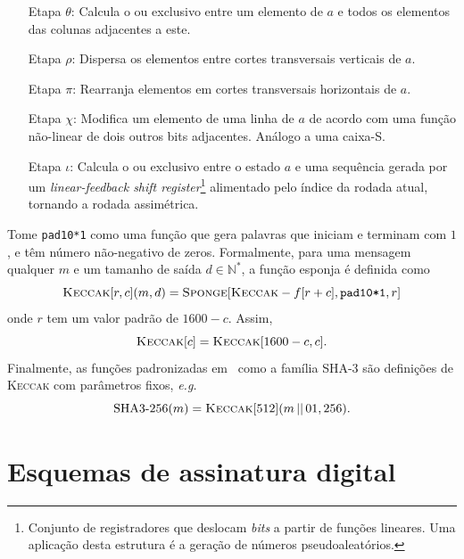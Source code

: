 \documentclass[12pt,notitlepage]{report}
\newcommand{\concat}{\, \vert \vert \,}
\begin{document}
\begin{enumerate}

  \item[Etapa $\theta$:] Calcula o ou exclusivo entre um elemento de $a$ e
      todos os elementos das colunas adjacentes a este.

  \item[Etapa $\rho$:] Dispersa os elementos entre cortes transversais
      verticais de $a$.

  \item[Etapa $\pi$:] Rearranja elementos em cortes transversais horizontais de
      $a$.

  \item[Etapa $\chi$:] Modifica um elemento de uma linha de $a$ de acordo com
      uma função não-linear de dois outros bits adjacentes. Análogo a uma
        caixa-S.

  \item[Etapa $\iota$:] Calcula o ou exclusivo entre o estado $a$ e uma
      sequência gerada por um \emph{linear-feedback shift register}\footnote{Conjunto de registradores que deslocam \emph{bits} a partir de funções lineares. Uma aplicação desta estrutura é a geração de números pseudoaleatórios.} alimentado
        pelo índice da rodada atual, tornando a rodada assimétrica.

\end{enumerate}

Tome \texttt{pad10*1} como uma função que gera palavras que iniciam e terminam
com $1$, e têm número não-negativo de zeros. Formalmente, para uma mensagem
qualquer $m$ e um tamanho de saída $d \in \mathbb{N}^{*}$, a função esponja é
definida como
\begin{equation}
  \textsc{Keccak}[r, c](m, d)
    = \textsc{Sponge}[\textsc{Keccak}-f[r + c], \texttt{pad10*1}, r]
\end{equation}
onde $r$ tem um valor padrão de $1600 - c$. Assim,
\begin{equation}
  \textsc{Keccak}[c] = \textsc{Keccak}[1600 - c, c].
\end{equation}
Finalmente, as funções padronizadas em~\cite{Dworkin2015} como a família SHA-3
são definições de \textsc{Keccak} com parâmetros fixos, \emph{e.g.}
\begin{equation}
  \text{SHA3-}256(m) = \textsc{Keccak}[512](m \concat 01, 256).
\end{equation}

\section{Esquemas de assinatura digital}
\label{section:digitalsig}
\end{document}
